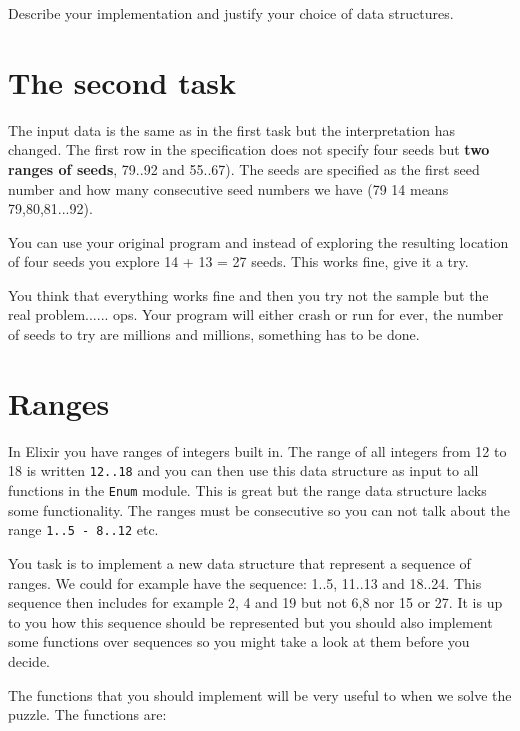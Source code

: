 \documentclass[a4paper,11pt]{article}
\begin{document}
Describe your implementation and justify your choice of data
structures.


\section*{The second task}

The input data is the same as in the first task but the
interpretation has changed. The first row in the specification does
not specify four seeds but {\bf two ranges of seeds}, 79..92 and
55..67). The seeds are specified as the first seed number and
how many consecutive seed numbers we have (79 14 means 79,80,81...92).

You can use your original program and instead of exploring the
resulting location of four seeds you explore 14 + 13 = 27 seeds. This
works fine, give it a try.

You think that everything works fine and then you try not the sample
but the real problem...... ops. Your program will either crash or run
for ever, the number of seeds to try are millions and
millions, something has to be done.


\section*{Ranges}

In Elixir you have ranges of integers built in. The range of all
integers from 12 to 18 is written {\tt 12..18} and you can then use
this data structure as input to all functions in the {\tt Enum}
module. This is great but the range data structure lacks some
functionality. The ranges must be consecutive so you can not talk
about the range {\tt 1..5 - 8..12} etc.

You task is to implement a new data structure that represent a
sequence of ranges. We could for example have the sequence: 1..5,
11..13 and 18..24. This sequence then includes for example 2, 4 and 19
but not 6,8 nor 15 or 27. It is up to you how this sequence should be
represented but you should also implement some functions over sequences
so you might take a look at them before you decide.

The functions that you should implement will be very useful to when
we solve the puzzle. The functions are:
\end{document}
